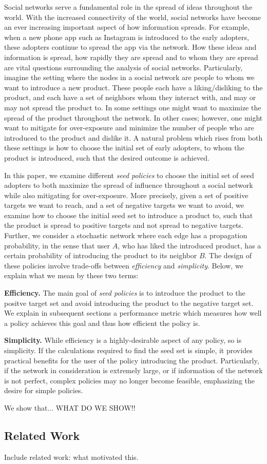 Social networks serve a fundamental role in the spread of ideas throughout the world. With the increased connectivity of the world, social networks have become an ever increasing important aspect of how information spreads. For example, when a new phone app such as Instagram is introduced to the early adopters, these adopters continue to spread the app via the network. How these ideas and information is spread, how rapidly they are spread and to whom they are spread are vital questions surrounding the analysis of social networks. Particularly, imagine the setting where the nodes in a social network are people to whom we want to introduce a new product. These people each have a liking/disliking to the product, and each have a set of neighbors whom they interact with, and may or may not spread the product to. In some settings one might want to maximize the spread of the product throughout the network. In other cases; however, one might want to mitigate for over-exposure and minimize the number of people who are introduced to the product and dislike it. A natural problem which rises from both these settings is how to choose the initial set of early adopters, to whom the product is introduced, such that the desired outcome is achieved.

In this paper, we examine different \textit{seed policies} to choose the initial set of seed adopters to both maximize the spread of influence throughout a social network while also mitigating for over-exposure. More precisely, given a set of positive targets we want to reach, and a set of negative targets we want to avoid, we examine how to choose the initial seed set to introduce a product to, such that the product is spread to positive targets and not spread to negative targets. Further, we consider a stochastic network where each edge has a propagation probability, in the sense that user $A$, who has liked the introduced product, has a certain probability of introducing the product to its neighbor $B$. The design of these policies involve trade-offs between \textit{efficiency} and \textit{simplicity}. Below, we explain what we mean by these two terms:

\noindent \textbf{Efficiency.} The main goal of \emph{seed policies} is to introduce the product to the positve target set and avoid introducing the product to the negative target set. We explain in subsequent sections a performance metric which measures how well a policy achieves this goal and thus how efficient the policy is.

\noindent \textbf{Simplicity. } While efficiency is a highly-desirable aspect of any policy, so is simplicity. If the calculations required to find the seed set is simple, it provides practical benefits for the user of the policy introducing the product. Particularly, if the network in consideration is extremely large, or if information of the network is not perfect, complex policies may no longer become feasible, emphasizing the desire for simple policies. 

We show that... WHAT DO WE SHOW!!


\subsection{Related Work}\label{sec:rel_work}

Include related work: what motivated this.

